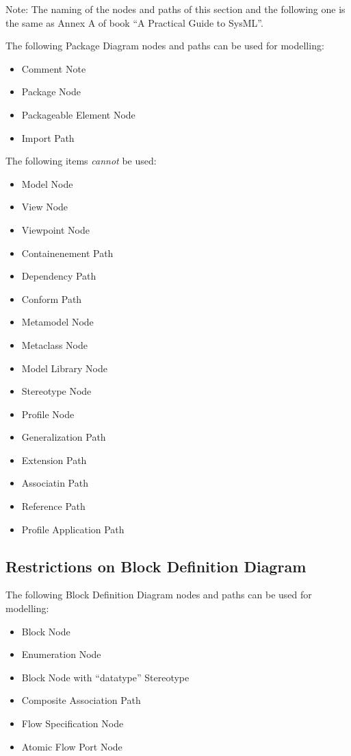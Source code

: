 Note: The naming of the nodes and paths of this section and the
following one is the same as Annex A of book ``A Practical Guide to
SysML''.


The following Package Diagram nodes and paths can be used for
modelling:
\begin{itemize}
\item Comment Note
\item Package Node
\item Packageable Element Node
\item Import Path
\end{itemize}

The following items \emph{cannot} be used:
\begin{itemize}
\item Model Node
\item View Node
\item Viewpoint Node
\item Containenement Path
\item Dependency Path
\item Conform Path
\item Metamodel Node
\item Metaclass Node
\item Model Library Node
\item Stereotype Node
\item Profile Node
\item Generalization Path
\item Extension Path
\item Associatin Path
\item Reference Path
\item Profile Application Path
\end{itemize}

\subsection{Restrictions on Block Definition Diagram}

The following Block Definition Diagram nodes and paths can be used for
modelling:
\begin{itemize}
\item Block Node
\item Enumeration Node
\item Block Node with ``datatype'' Stereotype
\item Composite Association Path
\item Flow Specification Node
\item Atomic Flow Port Node
\end{itemize}

